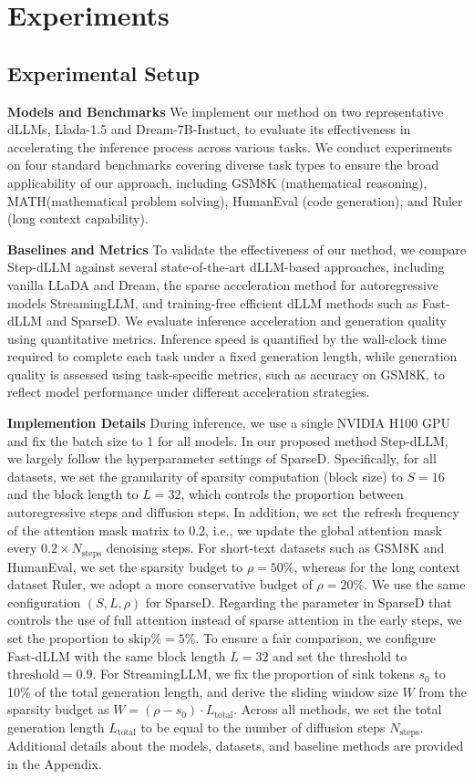 \section{Experiments}

\subsection{Experimental Setup}
\textbf{Models and Benchmarks} We implement our method on two representative dLLMs, Llada-1.5 and Dream-7B-Instuct, to evaluate its effectiveness in accelerating the inference process across various tasks. We conduct experiments on four standard benchmarks covering diverse task types to ensure the broad applicability of our approach, including GSM8K (mathematical reasoning), MATH(mathematical problem solving), HumanEval (code generation), and Ruler (long context capability).   

\textbf{Baselines and Metrics}
To validate the effectiveness of our method, we compare Step-dLLM against several state-of-the-art dLLM-based approaches, including vanilla LLaDA and Dream, the sparse acceleration method for autoregressive models StreamingLLM, and training-free efficient dLLM methods such as Fast-dLLM and SparseD. We evaluate inference acceleration and generation quality using quantitative metrics. Inference speed is quantified by the wall-clock time required to complete each task under a fixed generation length, while generation quality is assessed using task-specific metrics, such as accuracy on GSM8K, to reflect model performance under different acceleration strategies.

\textbf{Implemention Details}
During inference, we use a single NVIDIA H100 GPU and fix the batch size to 1 for all models. In our proposed method Step-dLLM, we largely follow the hyperparameter settings of SparseD. Specifically, for all datasets, we set the granularity of sparsity computation (block size) to \(S = 16\) and the block length to \(L = 32\), which controls the proportion between autoregressive steps and diffusion steps. In addition, we set the refresh frequency of the attention mask matrix to 0.2, i.e., we update the global attention mask every \(0.2 \times N_{\text{steps}}\) denoising steps. For short-text datasets such as GSM8K and HumanEval, we set the sparsity budget to \(\rho = 50\%\), whereas for the long context dataset Ruler, we adopt a more conservative budget of \(\rho = 20\%\). We use the same configuration \((S, L, \rho)\) for SparseD. Regarding the parameter in SparseD that controls the use of full attention instead of sparse attention in the early steps, we set the proportion to \(\text{skip}\% = 5\%\). To ensure a fair comparison, we configure Fast-dLLM with the same block length \(L = 32\) and set the threshold to \(\text{threshold} = 0.9\). For StreamingLLM, we fix the proportion of sink tokens \(s_0\) to 10\% of the total generation length, and derive the sliding window size \(W\) from the sparsity budget as $W = (\rho - s_0) \cdot L_{\text{total}}.$
Across all methods, we set the total generation length \(L_{\text{total}}\) to be equal to the number of diffusion steps \(N_{\text{steps}}\). Additional details about the models, datasets, and baseline methods are provided in the Appendix.

